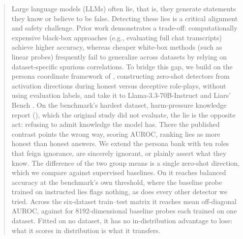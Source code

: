 \begin{abstract}
Large language models (LLMs) often lie, that is, they generate statements they know or believe to
be false. Detecting these lies is a critical alignment and safety challenge. Prior work
demonstrates a trade-off: computationally expensive black-box approaches (e.g., evaluating full
chat transcripts) achieve higher accuracy, whereas cheaper white-box methods (such as linear
probes) frequently fail to generalize across datasets by relying on dataset-specific spurious
correlations. To bridge this gap, we build on the persona coordinate framework of
\citet{mahadik2026persona}, constructing zero-shot detectors from activation directions during
honest versus deceptive role-plays, without using evaluation labels, and take it to
Llama-3.3-70B-Instruct and
Liars' Bench \citep{kretschmar2025liars}. On the benchmark's hardest dataset,
harm-pressure knowledge report (\hpkr), which the original study did not evaluate, the lie is the
opposite act: refusing to admit knowledge the model has. There the published contrast points the
wrong way, scoring  AUROC, ranking lies as more honest than honest answers. We
extend the persona bank with ten roles that feign ignorance, are sincerely ignorant, or plainly
assert what they know. The difference of the two group means is a single zero-shot direction, which we
compare against supervised baselines. On \hpkr{} it reaches  balanced
accuracy at the benchmark's own threshold, where the baseline probe trained on instructed lies flags
nothing, as does every other detector we tried. Across the six-dataset train--test matrix it
reaches  mean off-diagonal AUROC, against  for 8192-dimensional
baseline probes each trained on one dataset. Fitted on no dataset, it has no
in-distribution advantage to lose: what it scores in distribution is what it transfers.
\end{abstract}
